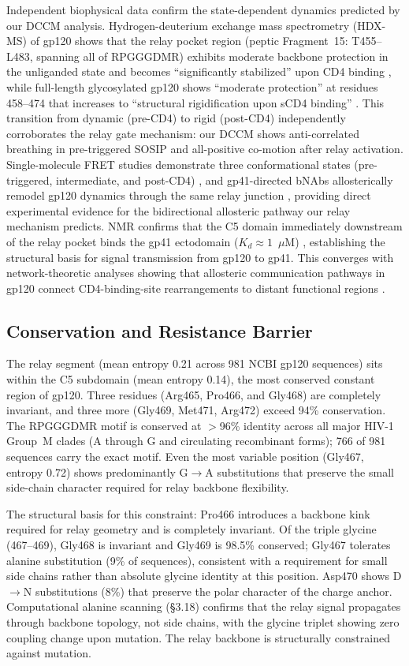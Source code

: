 \documentclass[11pt,a4paper]{article}
\begin{document}
Independent biophysical data confirm the state-dependent dynamics predicted by our DCCM analysis. Hydrogen-deuterium exchange mass spectrometry (HDX-MS) of gp120 shows that the relay pocket region (peptic Fragment~15: T455--L483, spanning all of RPGGGDMR) exhibits moderate backbone protection in the unliganded state and becomes ``significantly stabilized'' upon CD4 binding \citep{Kong2010}, while full-length glycosylated gp120 shows ``moderate protection'' at residues 458--474 that increases to ``structural rigidification upon sCD4 binding'' \citep{Guttman2012}. This transition from dynamic (pre-CD4) to rigid (post-CD4) independently corroborates the relay gate mechanism: our DCCM shows anti-correlated breathing in pre-triggered SOSIP and all-positive co-motion after relay activation. Single-molecule FRET studies demonstrate three conformational states (pre-triggered, intermediate, and post-CD4) \citep{Ma2018}, and gp41-directed bNAbs allosterically remodel gp120 dynamics through the same relay junction \citep{Xu2026}, providing direct experimental evidence for the bidirectional allosteric pathway our relay mechanism predicts. NMR confirms that the C5 domain immediately downstream of the relay pocket binds the gp41 ectodomain ($K_d \approx 1$~$\mu$M) \citep{Guilhaudis2002}, establishing the structural basis for signal transmission from gp120 to gp41. This converges with network-theoretic analyses showing that allosteric communication pathways in gp120 connect CD4-binding-site rearrangements to distant functional regions \citep{Henderson2020}.

\subsection{Conservation and Resistance Barrier}

The relay segment (mean entropy 0.21 across 981 NCBI gp120 sequences) sits within the C5 subdomain (mean entropy 0.14), the most conserved constant region of gp120. Three residues (Arg465, Pro466, and Gly468) are completely invariant, and three more (Gly469, Met471, Arg472) exceed 94\% conservation. The RPGGGDMR motif is conserved at $>$96\% identity across all major HIV-1 Group~M clades (A through G and circulating recombinant forms); 766 of 981 sequences carry the exact motif. Even the most variable position (Gly467, entropy 0.72) shows predominantly G$\to$A substitutions that preserve the small side-chain character required for relay backbone flexibility.

The structural basis for this constraint: Pro466 introduces a backbone kink required for relay geometry and is completely invariant. Of the triple glycine (467--469), Gly468 is invariant and Gly469 is 98.5\% conserved; Gly467 tolerates alanine substitution (9\% of sequences), consistent with a requirement for small side chains rather than absolute glycine identity at this position. Asp470 shows D$\to$N substitutions (8\%) that preserve the polar character of the charge anchor. Computational alanine scanning (\S3.18) confirms that the relay signal propagates through backbone topology, not side chains, with the glycine triplet showing zero coupling change upon mutation. The relay backbone is structurally constrained against mutation.
\end{document}
